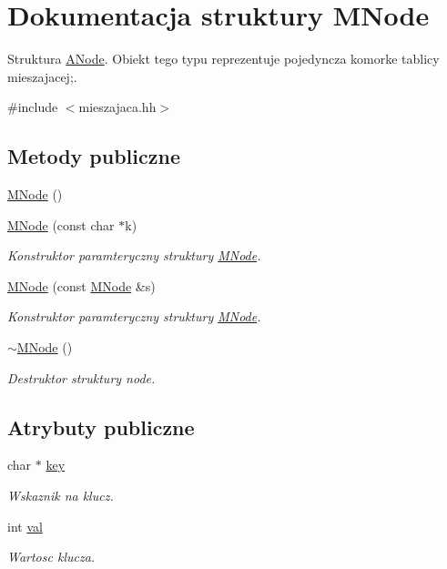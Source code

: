 \hypertarget{struct_m_node}{\section{Dokumentacja struktury M\-Node}
\label{struct_m_node}
}


Struktura \hyperlink{struct_a_node}{A\-Node}. Obiekt tego typu reprezentuje pojedyncza komorke tablicy mieszajacej;.  




{\ttfamily \#include $<$mieszajaca.\-hh$>$}

\subsection*{Metody publiczne}
\begin{DoxyCompactItemize}
\item 
\hyperlink{struct_m_node_a4f5e9c524bf97b5694d8f008e9436996}{M\-Node} ()
\item 
\hyperlink{struct_m_node_a579e99923a2f7cdacc468d2df179f9c3}{M\-Node} (const char $\ast$k)
\begin{DoxyCompactList}\small\item\em Konstruktor paramteryczny struktury \hyperlink{struct_m_node}{M\-Node}. \end{DoxyCompactList}\item 
\hyperlink{struct_m_node_a9fc5ae595ed230ab6af613daf0363303}{M\-Node} (const \hyperlink{struct_m_node}{M\-Node} \&s)
\begin{DoxyCompactList}\small\item\em Konstruktor paramteryczny struktury \hyperlink{struct_m_node}{M\-Node}. \end{DoxyCompactList}\item 
\hyperlink{struct_m_node_aa96f44f28eee1e25a9a267baaa61813d}{$\sim$\-M\-Node} ()
\begin{DoxyCompactList}\small\item\em Destruktor struktury node. \end{DoxyCompactList}\end{DoxyCompactItemize}
\subsection*{Atrybuty publiczne}
\begin{DoxyCompactItemize}
\item 
char $\ast$ \hyperlink{struct_m_node_a34eaceeae213bc93c9f18b752801a1f0}{key}
\begin{DoxyCompactList}\small\item\em Wskaznik na klucz. \end{DoxyCompactList}\item 
int \hyperlink{struct_m_node_a9ba04f597c758c10b9f2309322fe4c8d}{val}
\begin{DoxyCompactList}\small\item\em Wartosc klucza. \end{DoxyCompactList}\end{DoxyCompactItemize}
